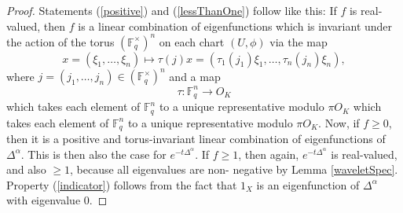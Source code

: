 \documentclass[a4paper,draft]{ZbRad}
\theoremstyle{plain}
\theoremstyle{definition}
\numberwithin{equation}{section}
\renewcommand{\ge}{\geqslant}\renewcommand{\geq}{\geqslant}
\begin{document}
\begin{proof}
\smallskip
Statements (\ref{positive}) and (\ref{lessThanOne}) follow like this: If $f$ is real-valued, then $f$ is a
linear combination
of eigenfunctions which is invariant under the action of
the torus $\left(\mathbb{F}_q^\times\right)^n$ on each chart $(U,\phi)$ via the map
\[
x = (\xi_1,\dots,\xi_n) \mapsto \tau(j)x = (\tau_1 (j_1)\xi_1,\dots,\tau_n(j_n)\xi_n),
\]
where $j = (j_1,\dots,j_n)\in\left(\mathbb{F}_q^\times\right)^n$
and a map
\[
\tau\colon\mathbb{F}_q^n\to O_K
\]
which takes each element of $\mathbb{F}_q^n$ to a unique representative modulo $\pi O_K$
which takes each element of $\mathbb{F}_q^n$ to a unique representative modulo $\pi O_K$.
Now, if $f\ge 0$, then it is a positive and torus-invariant linear combination
of eigenfunctions of $\Delta^\alpha$. This is then also the case for $e^{-t\Delta^\alpha}$. If $f\ge 1$, then
again, $e^{-t\Delta^\alpha}$ is real-valued, and also $\ge 1$, because all eigenvalues are non-
negative by Lemma \ref{waveletSpec}. Property (\ref{indicator}) follows from the fact that $1_X$ is an
eigenfunction of $\Delta^\alpha$ with eigenvalue $0$.


\end{proof}
\end{document}

